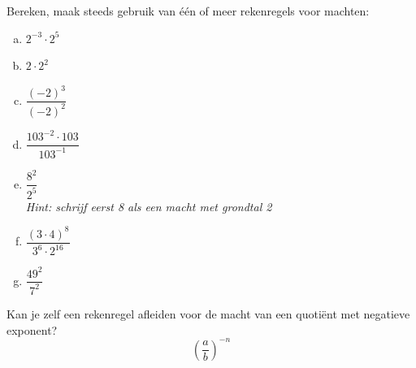 \documentclass[12pt,twoside,a4paper]{article}
\begin{document}
\begin{oefening}
Bereken, maak steeds gebruik van één of meer rekenregels voor machten:
\begin{multicols}{2}
  \begin{enumerate}[(a)]
    \itemsep1em
  \item $2^{-3}\cdot2^5$
  \item $2\cdot 2^2$
  \item $\dfrac{(-2)^3}{(-2)^2}$
  \item $\dfrac{103^{-2}\cdot 103}{103^{-1}}$
  \item $\dfrac{8^2}{2^5}$\\
    {\em\small Hint: schrijf eerst 8 als een macht met grondtal 2}
  \item $\dfrac{\left(3\cdot4\right)^8}{3^6\cdot 2^{16}}$
  \item $\dfrac{49^2}{7^2}$
  \end{enumerate}
\end{multicols}

\end{oefening}

\begin{oefening}
Kan je zelf een rekenregel afleiden voor de macht van een quotiënt met negatieve exponent?
$$\left(\dfrac{a}{b}\right)^{-n}$$
\end{oefening}

\end{document}
